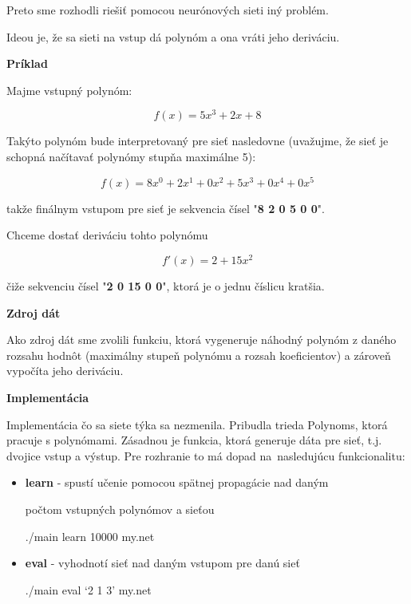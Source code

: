\documentclass[12pt]{article}
\newcommand{\mysmallsection}[1]{\vspace{0.5cm}{\centering\large\textbf{#1}\\}\normalsize\vspace{0.5cm}}
\begin{document}
Preto sme rozhodli riešiť pomocou neurónových sieti iný problém.

\newpage
\mysmallsection{Problém derivácie polynómu}

\noindent Ideou je, že sa sieti na vstup dá polynóm a ona vráti jeho deriváciu. 

{\vspace*{0.5cm}\centering\textbf{Príklad}\\}

\noindent Majme vstupný polynóm:

\begin{equation}
f(x)=5x^3 + 2x + 8
\end{equation}

Takýto polynóm bude interpretovaný pre sieť nasledovne (uvažujme, že sieť je schopná načítavať polynómy stupňa maximálne 5):

\begin{equation}
f(x)=8x^0 + 2x^1 + 0x^2 + 5x^3 + 0x^4 + 0x^5
\end{equation}

\noindent takže finálnym vstupom pre sieť je sekvencia čísel "\textbf{8 2 0 5 0 0}".

Chceme dostať deriváciu tohto polynómu

\begin{equation}
f'(x)=2 + 15x^2
\end{equation}

\noindent čiže sekvenciu čísel "\textbf{2 0 15 0 0}", ktorá je o jednu číslicu kratšia.

{\vspace*{0.5cm}\centering\textbf{Zdroj dát}\\}

Ako zdroj dát sme zvolili funkciu, ktorá vygeneruje náhodný polynóm z daného rozsahu hodnôt (maximálny stupeň polynómu a rozsah koeficientov) a zároveň vypočíta jeho deriváciu. 

{\vspace*{0.5cm}\centering\textbf{Implementácia}\\}

Implementácia čo sa siete týka sa nezmenila. Pribudla trieda Polynoms, ktorá pracuje s polynómami. Zásadnou je funkcia, ktorá generuje dáta pre sieť, t.j. dvojice vstup a výstup. Pre rozhranie to má dopad na~nasledujúcu funkcionalitu:

\begin{itemize}
\item \textbf{learn} - spustí učenie pomocou spätnej propagácie nad daným

\hspace{1.2cm} počtom vstupných polynómov a sieťou

{\centering\small ./main learn 10000 my.net \\}

\item \textbf{eval} - vyhodnotí sieť nad daným vstupom pre danú sieť

{\centering\small ./main eval `2 1 3' my.net \\}

\end{itemize}
\end{document}
